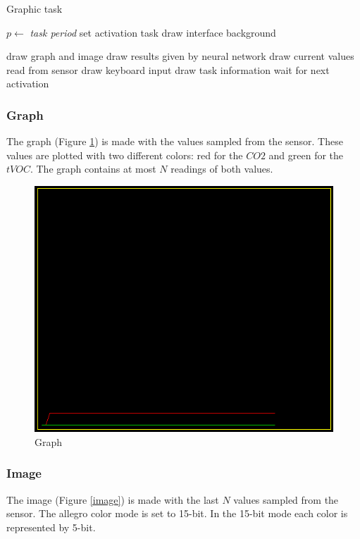 \documentclass[12pt]{article}
\begin{document}
\begin{algorithm}[H]
\caption{Graphic task}
\label{graphic}

\begin{algorithmic}
\State $p\gets$ \textit{task period}
\State set activation task
\State draw interface background

\Loop
\State draw graph and image
\State draw results given by neural network
\State draw current values read from sensor
\State draw keyboard input
\State draw task information
\State wait for next activation
\EndLoop

\end{algorithmic}
\end{algorithm}

\subsubsection*{Graph}
The graph (Figure \ref{graph}) is made with the values sampled from the 
sensor. These values are plotted with two different colors: red for the $CO2$
and green for the $tVOC$. The graph contains at most $N$ readings of both values.

\begin{figure}[H]
    \centering
    \includegraphics[scale=0.55]{images/graph.png}
    \caption{Graph }
    \label{graph}
\end{figure}

\subsubsection*{Image}
The image (Figure \ref{image}) is made with the last $N$ values sampled from
the sensor. The allegro color mode is set to 15-bit. In the 15-bit mode each
color is represented by 5-bit.
\end{document}
